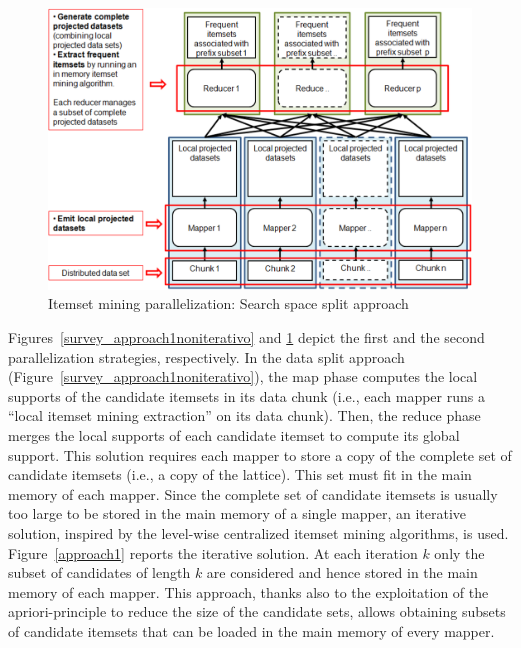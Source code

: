 \begin{figure}[!t]
\includegraphics[width=5in]{Approach2.eps}
\caption{Itemset mining parallelization: Search space split approach}
\label{approach2}
\end{figure}


Figures~\ref{survey_approach1noniterativo} and \ref{approach2} depict the first and the second parallelization strategies, respectively.  
In the data split approach (Figure~\ref{survey_approach1noniterativo}), the map phase computes the local supports of the candidate itemsets in its data chunk  (i.e., each mapper runs a ``local itemset mining extraction'' on its data chunk). Then, the reduce phase merges the local supports of each candidate itemset to compute its global support. This solution requires each mapper to store a copy of the complete set of candidate itemsets (i.e., a copy of the lattice). 
This set must fit in the main memory of each mapper. Since the complete set of candidate itemsets is usually too large to be stored in the main memory of a single mapper, an iterative solution, inspired by the level-wise centralized itemset mining algorithms, is used. Figure~\ref{approach1} reports the iterative solution. 
At each iteration $k$ only the subset of candidates of length $k$ are considered and hence stored in the main memory of each mapper. This approach, thanks also to the exploitation of the apriori-principle to reduce the size of the candidate sets, allows obtaining subsets of candidate itemsets that can be loaded in the main memory of every mapper.

